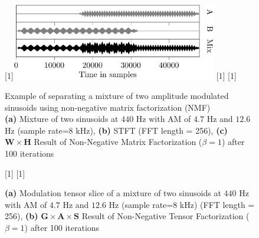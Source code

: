 {{%
\begin{figure}[h]
\centering
{}%
[1\textwidth]{\includegraphics[width=0.8\textwidth]{Chapters/05_Separation_Known/figures/Timepdf-crop.pdf}}%
\hspace{0.2\textwidth} %
[1\textwidth]{}%
\hspace{0.3\textwidth} %
[1\textwidth]{}%
\caption{Example of separating a mixture of two amplitude modulated sinusoids using non-negative matrix factorization (NMF)\\ \textbf{(a)} Mixture of two sinusoids at $440$ Hz with AM of $4.7$ Hz and $12.6$ Hz (sample rate=$8$ kHz), \textbf{(b)} STFT (FFT length = 256), \textbf{(c)} $\mathbf{W} \times \mathbf{H}$ Result of Non-Negative Matrix Factorization ($\beta = 1$) after 100 iterations}
\label{fig:count}
\end{figure}

\begin{figure}[h]
\centering
[1\textwidth]{}%
\hspace{0.3\textwidth} %
[1\textwidth]{}%
\caption{\textbf{(a)} Modulation tensor slice of a mixture of two sinusoids at $440$ Hz with AM of $4.7$ Hz and $12.6$ Hz (sample rate=$8$ kHz)  (FFT length = 256), \textbf{(b)}  $\mathbf{G} \times \mathbf{A} \times \mathbf{S} $ Result of Non-Negative Tensor Factorization ($\beta = 1$) after 100 iterations}
\label{fig:count}
\end{figure}


}}
